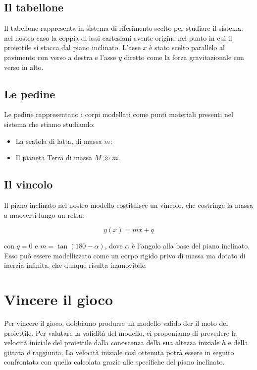 \documentclass{article}
\begin{document}
\subsection{Il tabellone}
Il tabellone rappresenta in sistema di riferimento scelto per studiare
il sistema: nel nostro caso la coppia di assi cartesiani avente
origine nel punto in cui il proiettile si stacca dal
piano inclinato. L'asse $x$ è stato scelto parallelo al pavimento
con verso a destra e l'asse $y$ diretto come la forza gravitazionale
con verso in alto.

\subsection{Le pedine}
Le pedine rappresentano i corpi modellati come punti materiali
presenti nel sistema che stiamo studiando:

\begin{itemize}
\item La scatola di latta, di massa $m$;
\item Il pianeta Terra di massa $M \gg m$.
\end{itemize}

\subsection{Il vincolo}
Il piano inclinato nel nostro modello costituisce un vincolo,
che costringe la massa a muoversi lungo un retta:

\begin{equation}
y(x) = m x + q
\end{equation}

con $q = 0$ e $m = \tan (180 -\alpha)$, dove $\alpha$ è l'angolo
alla base del piano inclinato.
Esso può essere modellizzato come un corpo rigido privo di massa
ma dotato di inerzia infinita, che dunque risulta inamovibile.

\section{Vincere il gioco}
Per vincere il gioco, dobbiamo produrre un modello valido
der il moto del proiettile. Per valutare la validità
del modello, ci proponiamo di prevedere la velocità iniziale
del proiettile dalla conoscenza della sua altezza iniziale
$h$ e della gittata $d$ raggiunta. La velocità iniziale
così ottenuta potrà essere in seguito confrontata con quella
calcolata grazie alle specifiche del piano inclinato.
\end{document}
